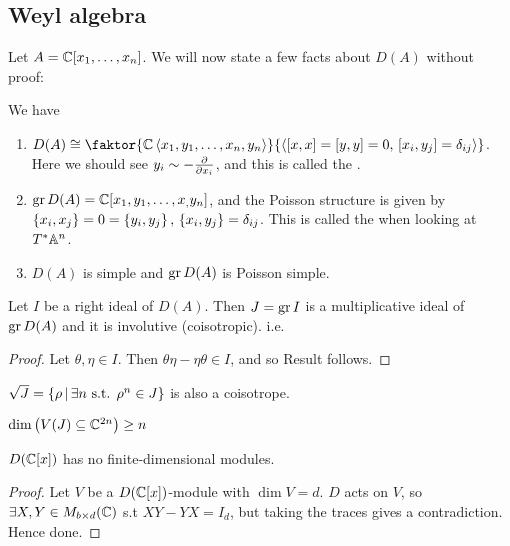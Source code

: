 \documentclass{article}
\begin{document}
\subsection{Weyl algebra}

Let $A = \mbb{C}[x_1, \dots, x_n]$. We will now state a few facts about $D(A)$ without proof: 

\begin{fact}
We have 
\begin{enumerate}
    \item $D(A) \cong \faktor{\mbb{C}\pangle{x_1,y_1, \dots, x_n, y_n}}{\pangle{\comm[x]{x} = \comm[y]{y}=0, \, \comm[x_i]{y_j} = \delta_{ij}}}$. Here we should see $y_i \sim -\pd{x_i}$, and this is called the . 
    \item $\gr D(A) = \mbb{C}[x_1, y_1, \dots, x_, y_n]$, and the Poisson structure is given by $\acomm[x_i]{x_j} = 0 = \acomm[y_i]{y_j}, \, \acomm[x_i]{y_j} = \delta_{ij}$. This is called the  when looking at $T^\ast \mbb{A}^n$. 
    \item $D(A)$ is simple and $\gr D(A)$ is Poisson simple. 
\end{enumerate}
\end{fact}

\begin{prop}
Let $I$ be a right ideal of $D(A)$. Then $J = \gr I$ is a multiplicative ideal of $\gr D(A)$ and it is involutive (coisotropic). i.e. 
\end{prop}
\begin{proof}
Let $\theta, \eta \in I$. Then $\theta \eta - \eta \theta \in I$, and so 
Result follows.
\end{proof}

\begin{theorem}[Gabber]
$\sqrt{J} = \pbrace{\rho \, | \, \exists n \text{ s.t. } \rho^n \in J}$ is also a coisotrope.
\end{theorem}

\begin{corollary}
$\dim \pround{V(J)\subseteq \mbb{C}^{2n}} \geq n$
\end{corollary}

\begin{corollary}
$D(\mbb{C}[x])$ has no finite-dimensional modules. 
\end{corollary}
\begin{proof}
Let $V$ be a $D(\mbb{C}[x])$-module with $\dim V = d$. $D$ acts on $V$, so $\exists X,Y \in M_{b \times d}(\mbb{C})$ s.t $XY - YX = I_d$, but taking the traces gives a contradiction. Hence done.
\end{proof}
\end{document}
